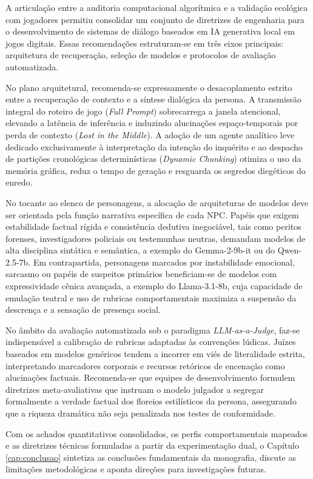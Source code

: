 A articulação entre a auditoria computacional algorítmica e a validação ecológica com jogadores permitiu consolidar um conjunto de diretrizes de engenharia para o desenvolvimento de sistemas de diálogo baseados em IA generativa local em jogos digitais. Essas recomendações estruturam-se em três eixos principais: arquitetura de recuperação, seleção de modelos e protocolos de avaliação automatizada.

No plano arquitetural, recomenda-se expressamente o desacoplamento estrito entre a recuperação de contexto e a síntese dialógica da persona. A transmissão integral do roteiro de jogo (\textit{Full Prompt}) sobrecarrega a janela atencional, elevando a latência de inferência e induzindo alucinações espaço-temporais por perda de contexto (\textit{Lost in the Middle}). A adoção de um agente analítico leve dedicado exclusivamente à interpretação da intenção do inquérito e ao despacho de partições cronológicas determinísticas (\textit{Dynamic Chunking}) otimiza o uso da memória gráfica, reduz o tempo de geração e resguarda os segredos diegéticos do enredo.

No tocante ao elenco de personagens, a alocação de arquiteturas de modelos deve ser orientada pela função narrativa específica de cada NPC. Papéis que exigem estabilidade factual rígida e consistência dedutiva inegociável, tais como peritos forenses, investigadores policiais ou testemunhas neutras, demandam modelos de alta disciplina sintática e semântica, a exemplo do Gemma-2-9b-it ou do Qwen-2.5-7b. Em contrapartida, personagens marcados por instabilidade emocional, sarcasmo ou papéis de suspeitos primários beneficiam-se de modelos com expressividade cênica avançada, a exemplo do Llama-3.1-8b, cuja capacidade de emulação teatral e uso de rubricas comportamentais maximiza a suspensão da descrença e a sensação de presença social.

No âmbito da avaliação automatizada sob o paradigma \textit{LLM-as-a-Judge}, faz-se indispensável a calibração de rubricas adaptadas às convenções lúdicas. Juízes baseados em modelos genéricos tendem a incorrer em viés de literalidade estrita, interpretando marcadores corporais e recursos retóricos de encenação como alucinações factuais. Recomenda-se que equipes de desenvolvimento formulem diretrizes meta-avaliativas que instruam o modelo julgador a segregar formalmente a verdade factual dos floreios estilísticos da persona, assegurando que a riqueza dramática não seja penalizada nos testes de conformidade.

Com os achados quantitativos consolidados, os perfis comportamentais mapeados e as diretrizes técnicas formuladas a partir da experimentação dual, o Capítulo \ref{cap:conclusao} sintetiza as conclusões fundamentais da monografia, discute as limitações metodológicas e aponta direções para investigações futuras.
